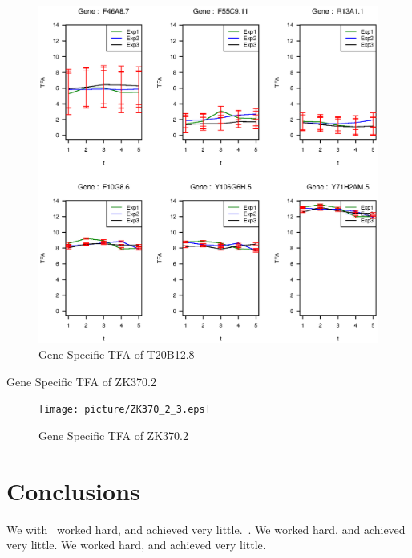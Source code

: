\documentclass[12pt]{article}
\begin{document}
      \begin{figure}
      \includegraphics[width=1.0\linewidth]{picture/T20B12_8_3.eps}
      \caption{Gene Specific TFA of T20B12.8}
      \end{figure}


      
      Gene Specific TFA of ZK370.2
      
      \begin{figure}
      \texttt{[image: picture/ZK370\_2\_3.eps]}
      \caption{Gene Specific TFA of ZK370.2}
      \end{figure}





\section{Conclusions}\label{conclusions}
We with ~\cite{mar:01}worked hard, and achieved very little.~\cite{Arif:02}. We worked hard, and achieved very little. We worked hard, and achieved very little.



\end{document}
